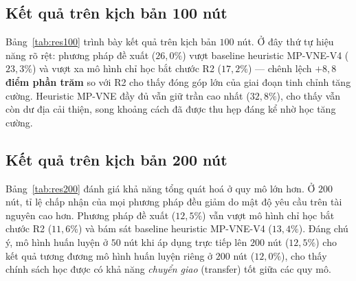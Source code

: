 \documentclass[../DoAn.tex]{subfiles}
\begin{document}
\subsection{Kết quả trên kịch bản 100 nút}
\label{subsec:res-100}

Bảng~\ref{tab:res100} trình bày kết quả trên kịch bản $100$ nút. Ở đây thứ tự hiệu năng rõ rệt: phương pháp đề xuất ($26{,}0\%$) vượt baseline heuristic MP-VNE-V4 ($23{,}3\%$) và vượt xa mô hình chỉ học bắt chước R2 ($17{,}2\%$) — chênh lệch \textbf{$+8{,}8$ điểm phần trăm} so với R2 cho thấy đóng góp lớn của giai đoạn tinh chỉnh tăng cường. Heuristic MP-VNE đầy đủ vẫn giữ trần cao nhất ($32{,}8\%$), cho thấy vẫn còn dư địa cải thiện, song khoảng cách đã được thu hẹp đáng kể nhờ học tăng cường.

\begin{table}[H]
\centering
\caption{Kết quả trên kịch bản 100 nút ($3000$ VNR kiểm thử)}
\label{tab:res100}
\end{table}

\subsection{Kết quả trên kịch bản 200 nút}
\label{subsec:res-200}

Bảng~\ref{tab:res200} đánh giá khả năng tổng quát hoá ở quy mô lớn hơn. Ở $200$ nút, tỉ lệ chấp nhận của mọi phương pháp đều giảm do mật độ yêu cầu trên tài nguyên cao hơn. Phương pháp đề xuất ($12{,}5\%$) vẫn vượt mô hình chỉ học bắt chước R2 ($11{,}6\%$) và bám sát baseline heuristic MP-VNE-V4 ($13{,}4\%$). Đáng chú ý, mô hình huấn luyện ở $50$ nút khi áp dụng trực tiếp lên $200$ nút ($12{,}5\%$) cho kết quả tương đương mô hình huấn luyện riêng ở $200$ nút ($12{,}0\%$), cho thấy chính sách học được có khả năng \textit{chuyển giao} (transfer) tốt giữa các quy mô.
\end{document}
